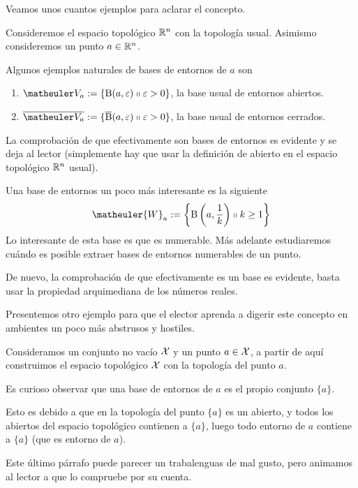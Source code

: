Veamos unos cuantos ejemplos para aclarar el concepto.
\begin{exa}
	\label{etop_exa_baseUsual}
	Consideremos el espacio topológico $\mathbb{R}^n$ con la topología usual. Asimismo consideremos un punto $a\in\mathbb{R}^n$.
	
	Algunos ejemplos naturales de bases de entornos de $a$ son
	\begin{enumerate}
		\item $\Va{a}:=\{\bola(a,\varepsilon)\tq \varepsilon>0\}$, la base usual de entornos abiertos.
		\item $\adher{\Va{a}}:=\{\adher{\bola}(a,\varepsilon)\tq \varepsilon>0\}$, la base usual de entornos cerrados.
	\end{enumerate}
	La comprobación de que efectivamente son bases de entornos es evidente y se deja al lector (simplemente hay que usar la definición de abierto en el espacio topológico $\mathbb{R}^n$ usual).
	
	Una base de entornos un poco más interesante es la siguiente
	\begin{equation}
		\matheuler{W}_a:=\left\{\bola\left(a,\frac{1}{k}\right)\tq k\geq 1\right\}
	\end{equation}
	Lo interesante de esta base es que es numerable. Más adelante estudiaremos cuándo es posible extraer bases de entornos numerables de un punto.
	
	De nuevo, la comprobación de que efectivamente es un base es evidente, basta usar la propiedad arquimediana de los números reales.
\end{exa}

Presentemos otro ejemplo para que el elector aprenda a digerir este concepto en ambientes un poco más abstrusos y hostiles.
\begin{exa}
	\label{etop_exa_basePunto}
	Consideramos un conjunto no vacío $\mathcal{X}$ y un punto $a\in \mathcal{X}$, a partir de aquí construimos el espacio topológico $\mathcal{X}$ con la topología del punto $a$.
	
	Es curioso observar que una base de entornos de $a$ es el propio conjunto $\{a\}$.
	
	Esto es debido a que en la topología del punto $\{a\}$ es un abierto, y todos los abiertos del espacio topológico contienen a $\{a\}$, luego todo entorno de $a$ contiene a $\{a\}$ (que es entorno de $a$).
	
	Este último párrafo puede parecer un trabalenguas de mal gusto, pero animamos al lector a que lo compruebe por su cuenta.
\end{exa}

